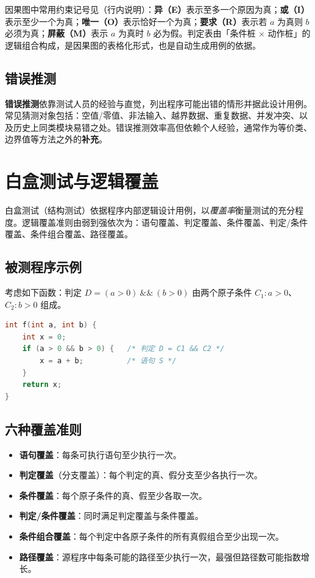 因果图中常用约束记号见（行内说明）：\textbf{异（E）}表示至多一个原因为真；\textbf{或（I）}表示至少一个为真；\textbf{唯一（O）}表示恰好一个为真；\textbf{要求（R）}表示若 $a$ 为真则 $b$ 必须为真；\textbf{屏蔽（M）}表示 $a$ 为真时 $b$ 必为假。判定表由「条件桩 $\times$ 动作桩」的逻辑组合构成，是因果图的表格化形式，也是自动生成用例的依据。

\subsection{错误推测}

\textbf{错误推测}依靠测试人员的经验与直觉，列出程序可能出错的情形并据此设计用例。常见猜测对象包括：空值/零值、非法输入、越界数据、重复数据、并发冲突、以及历史上同类模块易错之处。错误推测效率高但依赖个人经验，通常作为等价类、边界值等方法之外的\textbf{补充}。

\section{白盒测试与逻辑覆盖}

白盒测试（结构测试）依据程序内部逻辑设计用例，以\emph{覆盖率}衡量测试的充分程度。逻辑覆盖准则由弱到强依次为：语句覆盖、判定覆盖、条件覆盖、判定/条件覆盖、条件组合覆盖、路径覆盖。

\subsection{被测程序示例}

考虑如下函数：判定 $D=(a>0)\ \&\&\ (b>0)$ 由两个原子条件 $C_1:a>0$、$C_2:b>0$ 组成。

\begin{lstlisting}[language=C]
int f(int a, int b) {
    int x = 0;
    if (a > 0 && b > 0) {   /* 判定 D = C1 && C2 */
        x = a + b;          /* 语句 S */
    }
    return x;
}
\end{lstlisting}

\subsection{六种覆盖准则}

\begin{itemize}
    \item \textbf{语句覆盖}：每条可执行语句至少执行一次。
    \item \textbf{判定覆盖}（分支覆盖）：每个判定的真、假分支至少各执行一次。
    \item \textbf{条件覆盖}：每个原子条件的真、假至少各取一次。
    \item \textbf{判定/条件覆盖}：同时满足判定覆盖与条件覆盖。
    \item \textbf{条件组合覆盖}：每个判定中各原子条件的所有真假组合至少出现一次。
    \item \textbf{路径覆盖}：源程序中每条可能的路径至少执行一次，最强但路径数可能指数增长。
\end{itemize}

